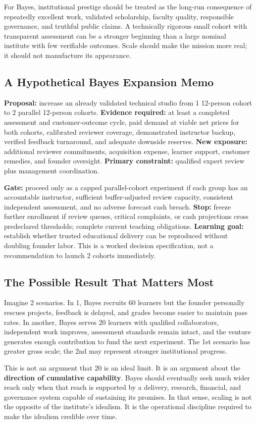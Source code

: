 For Bayes, institutional prestige should be treated as the long-run consequence of repeatedly excellent work, validated scholarship, faculty quality, responsible governance, and truthful public claims. A technically rigorous small cohort with transparent assessment can be a stronger beginning than a large nominal institute with few verifiable outcomes. Scale should make the mission more real; it should not manufacture its appearance.

\subsection{A Hypothetical Bayes Expansion Memo}
\label{sec:hypothetical_bayes_expansion_memo}

\textbf{Proposal:} increase an already validated technical studio from 1 12-person cohort to 2 parallel 12-person cohorts. \textbf{Evidence required:} at least a completed assessment and customer-outcome cycle, paid demand at viable net prices for both cohorts, calibrated reviewer coverage, demonstrated instructor backup, verified feedback turnaround, and adequate downside reserves. \textbf{New exposure:} additional reviewer commitments, acquisition expense, learner support, customer remedies, and founder oversight. \textbf{Primary constraint:} qualified expert review plus management coordination.

\textbf{Gate:} proceed only as a capped parallel-cohort experiment if each group has an accountable instructor, sufficient buffer-adjusted review capacity, consistent independent assessment, and no adverse forecast cash breach. \textbf{Stop:} freeze further enrollment if review queues, critical complaints, or cash projections cross predeclared thresholds; complete current teaching obligations. \textbf{Learning goal:} establish whether trusted educational delivery can be reproduced without doubling founder labor. This is a worked decision specification, not a recommendation to launch 2 cohorts immediately.

\subsection{The Possible Result That Matters Most}
\label{sec:result_that_matters_most}

Imagine 2 scenarios. In 1, Bayes recruits 60 learners but the founder personally rescues projects, feedback is delayed, and grades become easier to maintain pass rates. In another, Bayes serves 20 learners with qualified collaborators, independent work improves, assessment standards remain intact, and the venture generates enough contribution to fund the next experiment. The 1st scenario has greater gross scale; the 2nd may represent stronger institutional progress.

This is not an argument that 20 is an ideal limit. It is an argument about the \textbf{direction of cumulative capability}. Bayes should eventually seek much wider reach only when that reach is supported by a delivery, research, financial, and governance system capable of sustaining its promises. In that sense, scaling is not the opposite of the institute's idealism. It is the operational discipline required to make the idealism credible over time.

